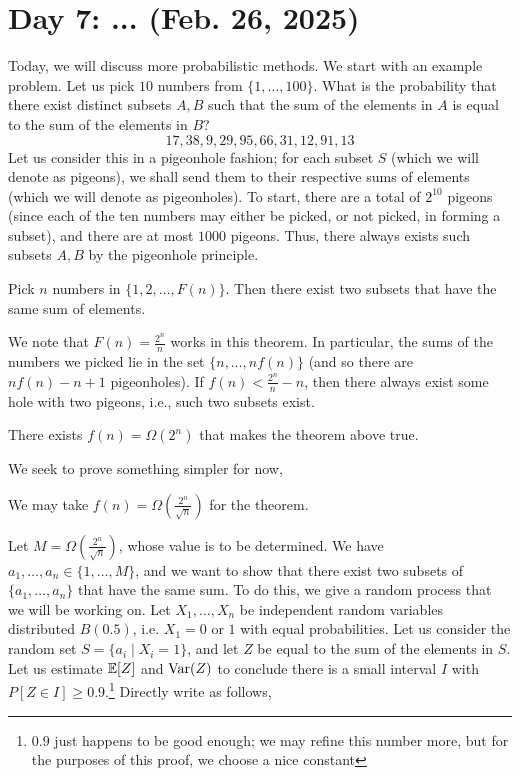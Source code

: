 \section{Day 7: ... (Feb. 26, 2025)}
Today, we will discuss more probabilistic methods. We start with an example problem. Let us pick $10$ numbers from $\{1, \dots, 100\}$. What is the probability that there exist distinct subsets $A, B$ such that the sum of the elements in $A$ is equal to the sum of the elements in $B$?
\[ 17, 38, 9, 29, 95, 66, 31, 12, 91, 13 \tag{Example Set} \]
Let us consider this in a pigeonhole fashion; for each subset $S$ (which we will denote as pigeons), we shall send them to their respective sums of elements (which we will denote as pigeonholes). To start, there are a total of $2^{10}$ pigeons (since each of the ten numbers may either be picked, or not picked, in forming a subset), and there are at most $1000$ pigeons. Thus, there always exists such subsets $A, B$ by the pigeonhole principle.
\begin{simplethm}
    Pick $n$ numbers in $\{1, 2, \dots, F(n)\}$. Then there exist two subsets that have the same sum of elements.
\end{simplethm}
\noindent We note that $F(n) = \frac{2^n}{n}$ works in this theorem. In particular, the sums of the numbers we picked lie in the set $\{n, \dots, nf(n)\}$ (and so there are $nf(n) - n + 1$ pigeonholes). If $f(n) < \frac{2^n}{n} - n$, then there always exist some hole with two pigeons, i.e., such two subsets exist.%
\begin{conjecture}
    There exists $f(n) = \Omega(2^n)$ that makes the theorem above true.
\end{conjecture}
\noindent We seek to prove something simpler for now,
\begin{simplethm}
    We may take $f(n) = \Omega(\frac{2^n}{\sqrt{n}})$ for the theorem.
\end{simplethm}
\noindent Let $M = \Omega(\frac{2^n}{\sqrt{n}})$, whose value is to be determined. We have $a_1, \dots, a_n \in \{1, \dots, M\}$, and we want to show that there exist two subsets of $\{a_1, \dots, a_n\}$ that have the same sum.
\medskip\newline
To do this, we give a random process that we will be working on. Let $X_1, \dots, X_n$ be independent random variables distributed $B(0.5)$, i.e. $X_1 = 0$ or $1$ with equal probabilities. Let us consider the random set $S = \{a_i \mid X_i = 1\}$, and let $Z$ be equal to the sum of the elements in $S$. Let us estimate $\mathbb E[Z]$ and $\operatorname{Var}(Z)$ to conclude there is a small interval $I$ with $P[Z \in I] \geq 0.9$.\footnote{$0.9$ just happens to be good enough; we may refine this number more, but for the purposes of this proof, we choose a nice constant} Directly write as follows,
